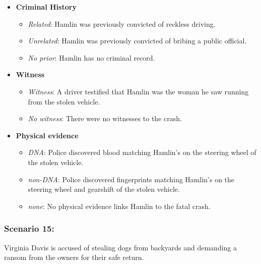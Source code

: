 \documentclass[
]{article}
\providecommand{\tightlist}{%
  \setlength{\itemsep}{0pt}\setlength{\parskip}{0pt}}
\begin{document}
\begin{itemize}
\tightlist
\item
  \textbf{Criminal History}

  \begin{itemize}
  \tightlist
  \item
    \emph{Related}: Hamlin was previously convicted of reckless driving.
  \item
    \emph{Unrelated}: Hamlin was previously convicted of bribing a
    public official.
  \item
    \emph{No prior}: Hamlin has no criminal record.
  \end{itemize}
\item
  \textbf{Witness}

  \begin{itemize}
  \tightlist
  \item
    \emph{Witness}: A driver testified that Hamlin was the woman he saw
    running from the stolen vehicle.
  \item
    \emph{No witness}: There were no witnesses to the crash.
  \end{itemize}
\item
  \textbf{Physical evidence}

  \begin{itemize}
  \tightlist
  \item
    \emph{DNA}: Police discovered blood matching Hamlin's on the
    steering wheel of the stolen vehicle.
  \item
    \emph{non-DNA}: Police discovered fingerprints matching Hamlin's on
    the steering wheel and gearshift of the stolen vehicle.
  \item
    \emph{none}: No physical evidence links Hamlin to the fatal crash.
  \end{itemize}
\end{itemize}

\hypertarget{scenario-15}{%
\subsubsection{Scenario 15:}\label{scenario-15}}

Virginia Davis is accused of stealing dogs from backyards and demanding
a ransom from the owners for their safe return.
\end{document}
